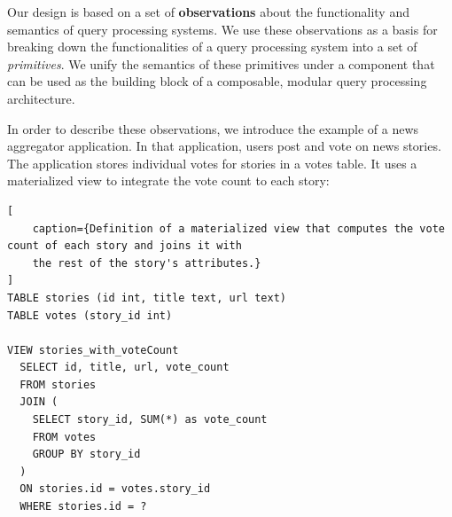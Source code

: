 



\bigskip
\noindent
Our design is based on a set of \textbf{observations} about the functionality and semantics of query processing systems.
We use these observations as a basis for breaking down the functionalities of a query processing system into a
set of \textit{primitives}.
We unify the semantics of these primitives under a component that can be used as the building block
of a composable, modular query processing architecture.

In order to describe these observations, we introduce the example of a news aggregator application.
In that application, users post and vote on news stories.
The application stores individual votes for stories in a votes table.
It uses a materialized view to integrate the vote count to each story:

\begin{lstlisting}[
    caption={Definition of a materialized view that computes the vote count of each story and joins it with
    the rest of the story's attributes.}
]
TABLE stories (id int, title text, url text)
TABLE votes (story_id int)

VIEW stories_with_voteCount
  SELECT id, title, url, vote_count
  FROM stories
  JOIN (
    SELECT story_id, SUM(*) as vote_count
    FROM votes
    GROUP BY story_id
  )
  ON stories.id = votes.story_id
  WHERE stories.id = ?
\end{lstlisting}

